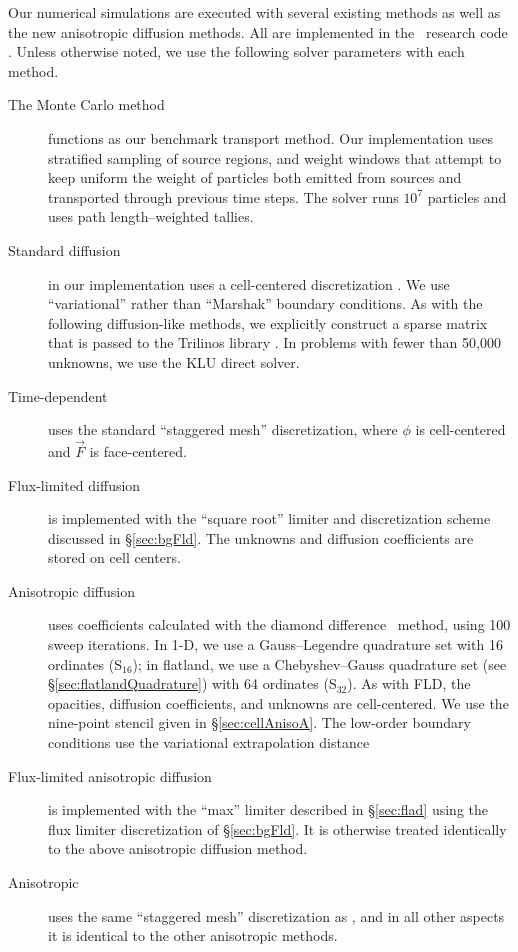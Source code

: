 Our numerical simulations are executed with several existing methods as well
as the new anisotropic diffusion methods. All
are implemented in the \pytrt\ research code \cite{Pytrt}. Unless otherwise
noted, we use the following solver parameters with each method.
\begin{description}
  \item[The Monte Carlo method] functions as our benchmark transport method. Our
    implementation uses stratified sampling of source regions, and weight
    windows that attempt to keep uniform the weight of particles both emitted
    from sources and transported through previous time steps. The solver runs
    $10^7$ particles and uses path length--weighted tallies.

  \item[Standard diffusion] in our implementation uses a cell-centered
    discretization \cite{Dud1976}.  We use ``variational'' rather than
    ``Marshak'' boundary conditions.
    As with the following diffusion-like methods, we explicitly
    construct a sparse matrix that is passed to the Trilinos library
    \cite{Her2003}.  In problems with fewer than 50,000 unknowns, we use the KLU
    direct solver. 

  \item[Time-dependent \Pone] uses the standard ``staggered mesh''
    discretization, where $\phi$ is cell-centered and $\vec{F}$ is
    face-centered.

  \item[Flux-limited diffusion] is implemented with the ``square root'' limiter
    and discretization scheme discussed in \S\ref{sec:bgFld}. The unknowns and
    diffusion coefficients are stored on cell centers.

  \item[Anisotropic diffusion] uses
    coefficients calculated with the diamond difference \SN\ method, using 100
    sweep iterations. In 1-D, we use a Gauss--Legendre quadrature set with 16
    ordinates (S$_{16}$); in flatland, we use a Chebyshev--Gauss quadrature set
    (see \S\ref{sec:flatlandQuadrature}) with 64 ordinates (S$_{32}$). As
    with FLD, the opacities, diffusion coefficients, and unknowns are
    cell-centered. We use the nine-point stencil given in
    \S\ref{sec:cellAnisoA}. The low-order boundary conditions use the
    variational extrapolation distance 

  \item[Flux-limited anisotropic diffusion] is implemented with the
    ``max'' limiter described in \S\ref{sec:flad} using the flux limiter
    discretization of \S\ref{sec:bgFld}. It is otherwise treated identically to
    the above anisotropic diffusion method.

  \item[Anisotropic \Pone] uses the same ``staggered mesh'' discretization
    as \Pone, and in all other aspects it is identical to the other anisotropic
    methods.

\end{description}

